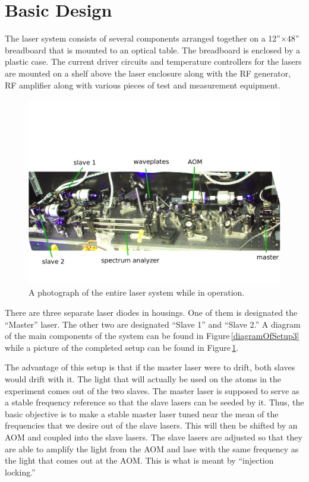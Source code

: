 \section{Basic Design}
The laser system consists of several components arranged together on a 12''$\times$48'' breadboard that is mounted to an optical table. The breadboard is enclosed by a plastic case. The current driver circuits and temperature controllers for the lasers are mounted on a shelf above the laser enclosure along with the RF generator, RF amplifier along with various pieces of test and measurement equipment.  
\begin{figure}
    \centerline{\includegraphics[width=1\textwidth]{entire_setup}}
    \caption[Photo of Entire System]{\label{fullexperimentphoto}
A photograph of the entire laser system while in operation. 
    }
\end{figure}

There are three separate laser diodes in housings. One of them is designated the ``Master'' laser. The other two are designated ``Slave 1'' and ``Slave 2.'' 
 A diagram of the main components of the system can be found in Figure\,\ref{diagramOfSetup3} while a picture of the completed setup can be found in Figure\,\ref{fullexperimentphoto}. 

The advantage of this setup is that if the master laser were to drift, both slaves would drift with it. The light that will actually be used on the atoms in the experiment comes out of the two slaves. The master laser is supposed to serve as a stable frequency reference so that the slave lasers can be seeded by it. Thus, the basic objective is to make a stable master laser tuned near the mean of the frequencies that we desire out of the slave lasers. This will then be shifted by an AOM and coupled into the slave lasers. The slave lasers are adjusted so that they are able to amplify the light from the AOM and lase with the same frequency as the light that comes out at the AOM. This is what is meant by ``injection locking.''

